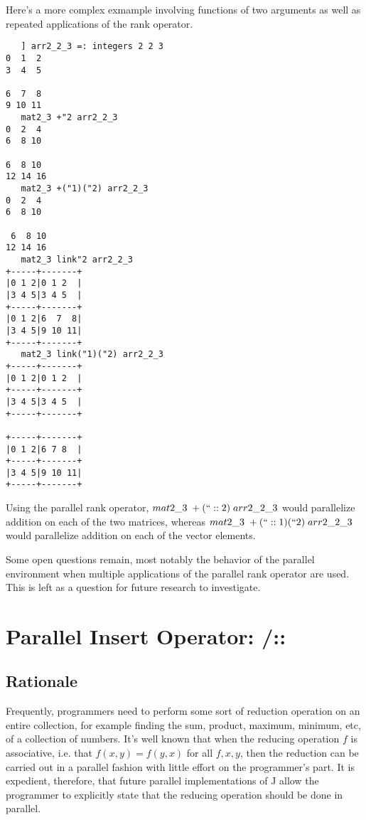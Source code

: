 Here's a more complex exmample involving functions of two arguments 
as well as repeated applications of the rank operator.

\begin{singlespacing}
\begin{small}
\begin{verbatim}
   ] arr2_2_3 =: integers 2 2 3
0  1  2
3  4  5

6  7  8
9 10 11
   mat2_3 +"2 arr2_2_3
0  2  4
6  8 10

6  8 10
12 14 16
   mat2_3 +("1)("2) arr2_2_3
0  2  4
6  8 10

 6  8 10
12 14 16
   mat2_3 link"2 arr2_2_3
+-----+-------+
|0 1 2|0 1 2  |
|3 4 5|3 4 5  |
+-----+-------+
|0 1 2|6  7  8|
|3 4 5|9 10 11|
+-----+-------+
   mat2_3 link("1)("2) arr2_2_3
+-----+-------+
|0 1 2|0 1 2  |
+-----+-------+
|3 4 5|3 4 5  |
+-----+-------+

+-----+-------+
|0 1 2|6 7 8  |
+-----+-------+
|3 4 5|9 10 11|
+-----+-------+
\end{verbatim}
\end{small}
\end{singlespacing}


Using the parallel rank operator, 
$mat2\_3\;+(``::2)\;arr2\_2\_3$ would parallelize addition on each of the two matrices, whereas
$mat2\_3\;+(``::1)(``2)\;arr2\_2\_3$ would parallelize addition on each of the vector elements.

Some open questions remain, most notably 
the behavior of the parallel environment when multiple applications of the parallel rank operator are used. 
This is left as a question for future research to investigate.

\section{Parallel Insert Operator: \ttfamily /:: \normalfont}
\label{pins}
\subsection{Rationale}
Frequently, programmers need to perform some sort of reduction operation on an entire collection, 
for example finding the sum, product, maximum, minimum, etc, of a collection of numbers.
It's well known that when the reducing operation $f$ is associative, i.e. that $f(x,y) = f(y,x)$ for all $f, x, y$, 
then the reduction can be carried out in a parallel fashion with little effort on the programmer's part.
It is expedient, therefore, that future parallel implementations of J allow the programmer 
to explicitly state that the reducing operation should be done in parallel.

